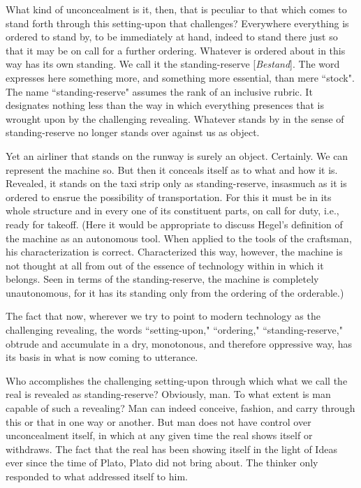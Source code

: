 What kind of unconcealment is it, then, that is peculiar to that which comes to stand forth through this setting-upon that challenges? Everywhere everything is ordered to stand by, to be immediately at hand, indeed to stand there just so that it may be on call for a further ordering. Whatever is ordered about in this way has its own standing. We call it the standing-reserve [\textit{Bestand}]. The word expresses here something more, and something more essential, than mere ``stock". The name ``standing-reserve" assumes the rank of an inclusive rubric. It designates nothing less than the way in which everything presences that is wrought upon by the challenging revealing. Whatever stands by in the sense of standing-reserve no longer stands over against us as object.

Yet an airliner that stands on the runway is surely an object. Certainly. We can represent the machine so. But then it conceals itself as to what and how it is. Revealed, it stands on the taxi strip only as standing-reserve, insasmuch as it is ordered to ensrue the possibility of transportation. For this it must be in its whole structure and in every one of its constituent parts, on call for duty, i.e., ready for takeoff. (Here it would be appropriate to discuss Hegel's definition of the machine as an autonomous tool. When applied to the tools of the craftsman, his characterization is correct. Characterized this way, however, the machine is not thought at all from out of the essence of technology within in which it belongs. Seen in terms of the standing-reserve, the machine is completely unautonomous, for it has its standing only from the ordering of the orderable.)

The fact that now, wherever we try to point to modern technology as the challenging revealing, the words ``setting-upon," ``ordering," ``standing-reserve," obtrude and accumulate in a dry, monotonous, and therefore oppressive way, has its basis in what is now coming to utterance.

Who accomplishes the challenging setting-upon through which what we call the real is revealed as standing-reserve? Obviously, man. To what extent is man capable of such a revealing? Man can indeed conceive, fashion, and carry through this or that in one way or another. But man does not have control over unconcealment itself, in which at any given time the real shows itself or withdraws. The fact that the real has been showing itself in the light of Ideas ever since the time of Plato, Plato did not bring about. The thinker only responded to what addressed itself to him.

